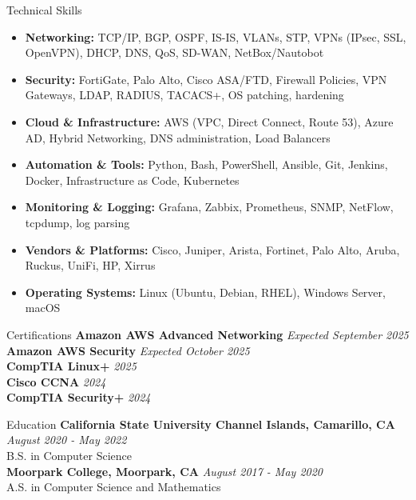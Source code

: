 \documentclass[
	11pt
]{resume}
\begin{document}
\begin{rSection}{Technical Skills}
\begin{itemize}
  \item \textbf{Networking:} TCP/IP, BGP, OSPF, IS-IS, VLANs, STP, VPNs (IPsec, SSL, OpenVPN), DHCP, DNS, QoS, SD-WAN, NetBox/Nautobot
  \item \textbf{Security:} FortiGate, Palo Alto, Cisco ASA/FTD, Firewall Policies, VPN Gateways, LDAP, RADIUS, TACACS+, OS patching, hardening
  \item \textbf{Cloud \& Infrastructure:} AWS (VPC, Direct Connect, Route 53), Azure AD, Hybrid Networking, DNS administration, Load Balancers
  \item \textbf{Automation \& Tools:} Python, Bash, PowerShell, Ansible, Git, Jenkins, Docker, Infrastructure as Code, Kubernetes
  \item \textbf{Monitoring \& Logging:} Grafana, Zabbix, Prometheus, SNMP, NetFlow, tcpdump, log parsing
  \item \textbf{Vendors \& Platforms:} Cisco, Juniper, Arista, Fortinet, Palo Alto, Aruba, Ruckus, UniFi, HP, Xirrus
  \item \textbf{Operating Systems:} Linux (Ubuntu, Debian, RHEL), Windows Server, macOS
\end{itemize}
\end{rSection}

\begin{rSection}{Certifications}
    \textbf{Amazon AWS Advanced Networking} \hfill \textit{Expected September 2025} \\
    \textbf{Amazon AWS Security} \hfill \textit{Expected October 2025} \\
    \textbf{CompTIA Linux+} \hfill \textit{2025} \\ 
    \textbf{Cisco CCNA} \hfill \textit{2024} \\
    \textbf{CompTIA Security+} \hfill \textit{2024} \\
\end{rSection}

\begin{rSection}{Education}
	\textbf{California State University Channel Islands, Camarillo, CA} \hfill \textit{August 2020 - May 2022} \\ 
	B.S. in Computer Science \\

    \textbf{Moorpark College, Moorpark, CA} \hfill \textit{August 2017 - May 2020} \\ 
	A.S. in Computer Science and Mathematics \\
\end{rSection}
\end{document}
